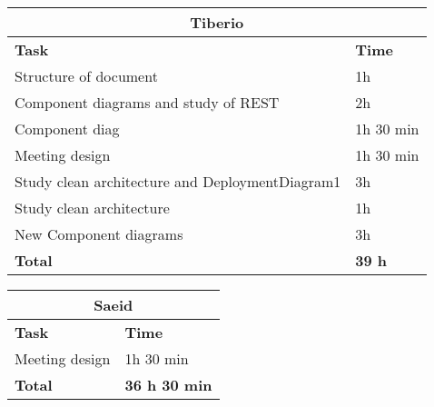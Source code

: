 \begin{table}[H]
\begin{tabular}{|l|l|}
\hline
\multicolumn{2}{|c|}{\textbf{Tiberio}}            \\ \hline
\textbf{Task}                   & \textbf{Time} \\ \hline
Structure of document                & 1h      \\ \hline
Component diagrams and study of REST       & 2h      \\ \hline
Component diag & 1h 30 min \\ \hline
Meeting design & 1h 30 min \\ \hline
Study clean architecture and DeploymentDiagram1 & 3h \\ \hline
Study clean architecture & 1h \\ \hline
New Component diagrams & 3h \\ \hline 

\rowcolor {polilight}
\textbf{Total}                  & \textbf{39 h}   \\ \hline
\end{tabular}
\end{table}


\begin{table}[H]
\begin{tabular}{|l|l|}
\hline
\multicolumn{2}{|c|}{\textbf{Saeid}}            \\ \hline
\textbf{Task}                   & \textbf{Time} \\ \hline
Meeting design & 1h 30 min \\ \hline
\rowcolor {polilight}
\textbf{Total}                  & \textbf{36 h 30 min}   \\ \hline
\end{tabular}
\end{table}
